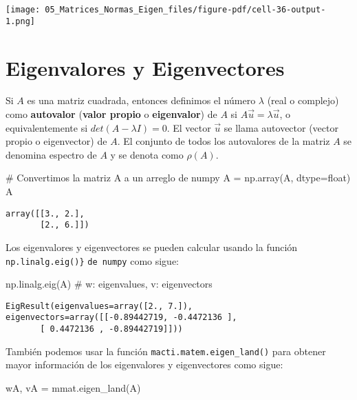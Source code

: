 \documentclass[
  letterpaper,
  DIV=11,
  numbers=noendperiod]{scrreprt}
\newenvironment{Shaded}{\begin{snugshade}}{\end{snugshade}}
\newcommand{\BuiltInTok}[1]{\textcolor[rgb]{0.00,0.23,0.31}{#1}}
\newcommand{\CommentTok}[1]{\textcolor[rgb]{0.37,0.37,0.37}{#1}}
\newcommand{\NormalTok}[1]{\textcolor[rgb]{0.00,0.23,0.31}{#1}}
\newcommand{\OperatorTok}[1]{\textcolor[rgb]{0.37,0.37,0.37}{#1}}
\begin{document}
\texttt{[image: 05\_Matrices\_Normas\_Eigen\_files/figure-pdf/cell-36-output-1.png]}

\section{Eigenvalores y
Eigenvectores}\label{eigenvalores-y-eigenvectores}

Si \(A\) es una matriz cuadrada, entonces definimos el número
\(\lambda\) (real o complejo) como \textbf{autovalor} (\textbf{valor
propio} o \textbf{eigenvalor}) de \(A\) si
\(A\vec{u} = \lambda \vec{u}\), o equivalentemente si
\(det(A - \lambda I) = 0\). El vector \(\vec{u}\) se llama autovector
(vector propio o eigenvector) de \(A\). El conjunto de todos los
autovalores de la matriz \(A\) se denomina espectro de \(A\) y se denota
como \(\rho(A)\).

\begin{Shaded}
\begin{Highlighting}[]
\CommentTok{\# Convertimos la matriz A a un arreglo de numpy}
\NormalTok{A }\OperatorTok{=}\NormalTok{ np.array(A, dtype}\OperatorTok{=}\BuiltInTok{float}\NormalTok{)}
\NormalTok{A}
\end{Highlighting}
\end{Shaded}

\begin{verbatim}
array([[3., 2.],
       [2., 6.]])
\end{verbatim}

Los eigenvalores y eigenvectores se pueden calcular usando la función
\texttt{np.linalg.eig()\}} \texttt{de\ numpy} como sigue:

\begin{Shaded}
\begin{Highlighting}[]
\NormalTok{np.linalg.eig(A)  }\CommentTok{\# w: eigenvalues, v: eigenvectors}
\end{Highlighting}
\end{Shaded}

\begin{verbatim}
EigResult(eigenvalues=array([2., 7.]), eigenvectors=array([[-0.89442719, -0.4472136 ],
       [ 0.4472136 , -0.89442719]]))
\end{verbatim}

También podemos usar la función \texttt{macti.matem.eigen\_land()} para
obtener mayor información de los eigenvalores y eigenvectores como
sigue:

\begin{Shaded}
\begin{Highlighting}[]
\NormalTok{wA, vA }\OperatorTok{=}\NormalTok{ mmat.eigen\_land(A)}
\end{Highlighting}
\end{Shaded}
\end{document}

